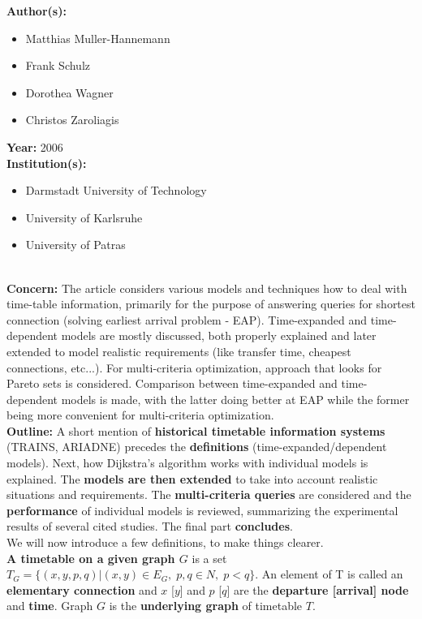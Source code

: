 \documentclass[a4paper]{article}
\newenvironment{itemizesp}
{
    \begin{itemize}
}
{
    \end{itemize}
}
\newcommand{\textbff}[1]{{\large \textbf{#1}}}
\begin{document}
        \textbff{Author(s): }
        \begin{itemizesp}
            \item Matthias Muller-Hannemann
            \item Frank Schulz
            \item Dorothea Wagner
            \item Christos Zaroliagis
        \end{itemizesp}
        \textbff{Year: }2006 \\
        \textbff{Institution(s): }
        \begin{itemizesp}
            \item Darmstadt University of Technology
            \item University of Karlsruhe
            \item University of Patras
        \end{itemizesp}
        {\hfill}\\
        \textbff{Concern:} The article considers various models and techniques how to deal with time-table information, primarily for the purpose of answering queries for shortest connection (solving earliest arrival problem - EAP). Time-expanded and time-dependent models are mostly discussed, both properly explained and later extended to model realistic requirements (like transfer time, cheapest connections, etc...). For multi-criteria optimization, approach that looks for Pareto sets is considered. Comparison between time-expanded and time-dependent models is made, with the latter doing better at EAP while the former being more convenient for multi-criteria optimization. \\

        \textbff{Outline:} A short mention of \textbf{historical timetable information systems} (TRAINS, ARIADNE) precedes the \textbf{definitions} (time-expanded/dependent models). Next, how Dijkstra's algorithm works with individual models is explained. The \textbf{models are then extended} to take into account realistic situations and requirements. The \textbf{multi-criteria queries} are considered and the \textbf{performance} of individual models is reviewed, summarizing the experimental results of several cited studies. The final part \textbf{concludes}. \\

        We will now introduce a few definitions, to make things clearer. \\

        \def\deftimetable{\textbf{A timetable on a given graph $G$} is a set $T_{G} = \{(x, y, p, q)|(x, y) \in E_{G}, \; p, q \in N, \; p < q \}$. An element of T is called an \textbf{elementary connection} and $x$ [$y$] and $p$ [$q$] are the \textbf{departure [arrival] node} and \textbf{time}. Graph $G$ is the \textbf{underlying graph} of timetable $T$.}\deftimetable \\
\end{document}
